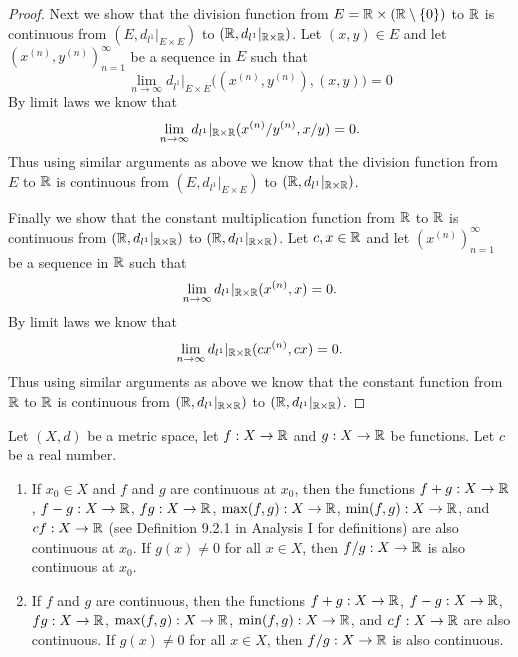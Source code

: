 \begin{proof}
  Next we show that the division function from \(E = \mathbb{R} \times (\mathbb{R} \setminus \left\lbrace0\right\rbrace)\) to \(\mathbb{R}\) is continuous from \((E, d_{l^1}|_{E \times E})\) to \((\mathbb{R}, d_{l^1}|_{\mathbb{R} \times \mathbb{R}})\).
  Let \((x, y) \in E\) and let \((x^{(n)}, y^{(n)})_{n = 1}^\infty\) be a sequence in \(E\) such that
  \[
    \lim_{n \to \infty} d_{l^1}|_{E \times E}\big((x^{(n)}, y^{(n)}), (x, y)\big) = 0
  \]
  By limit laws we know that
  \[
    \lim_{n \to \infty} d_{l^1}|_{\mathbb{R} \times \mathbb{R}}(x^{(n)} / y^{(n)}, x / y) = 0.
  \]
  Thus using similar arguments as above we know that the division function from \(E\) to \(\mathbb{R}\) is continuous from \((E, d_{l^1}|_{E \times E})\) to \((\mathbb{R}, d_{l^1}|_{\mathbb{R} \times \mathbb{R}})\).

  Finally we show that the constant multiplication function from \(\mathbb{R}\) to \(\mathbb{R}\) is continuous from \((\mathbb{R}, d_{l^1}|_{\mathbb{R} \times \mathbb{R}})\) to \((\mathbb{R}, d_{l^1}|_{\mathbb{R} \times \mathbb{R}})\).
  Let \(c, x \in \mathbb{R}\) and let \((x^{(n)})_{n = 1}^\infty\) be a sequence in \(\mathbb{R}\) such that
  \[
    \lim_{n \to \infty} d_{l^1}|_{\mathbb{R} \times \mathbb{R}}(x^{(n)}, x) = 0.
  \]
  By limit laws we know that
  \[
    \lim_{n \to \infty} d_{l^1}|_{\mathbb{R} \times \mathbb{R}}(cx^{(n)}, cx) = 0.
  \]
  Thus using similar arguments as above we know that the constant function from \(\mathbb{R}\) to \(\mathbb{R}\) is continuous from \((\mathbb{R}, d_{l^1}|_{\mathbb{R} \times \mathbb{R}})\) to \((\mathbb{R}, d_{l^1}|_{\mathbb{R} \times \mathbb{R}})\).
\end{proof}

\begin{cor}\label{2.2.3}
  Let \((X, d)\) be a metric space, let \(f : X \to \mathbb{R}\) and \(g : X \to \mathbb{R}\) be functions.
  Let \(c\) be a real number.
  \begin{enumerate}
    \item If \(x_0 \in X\) and \(f\) and \(g\) are continuous at \(x_0\), then the functions \(f + g : X \to \mathbb{R}\), \(f - g : X \to \mathbb{R}\), \(fg : X \to \mathbb{R}\), \(\max(f, g) : X \to \mathbb{R}\), \(\min(f, g) : X \to \mathbb{R}\), and \(cf : X \to \mathbb{R}\) (see Definition 9.2.1 in Analysis I for definitions) are also continuous at \(x_0\).
          If \(g(x) \neq 0\) for all \(x \in X\), then \(f / g : X \to \mathbb{R}\) is also continuous at \(x_0\).
    \item If \(f\) and \(g\) are continuous, then the functions \(f + g : X \to \mathbb{R}\), \(f - g : X \to \mathbb{R}\), \(fg : X \to \mathbb{R}\), \(\max(f, g) : X \to \mathbb{R}\), \(\min(f, g) : X \to \mathbb{R}\), and \(cf : X \to \mathbb{R}\) are also continuous.
          If \(g(x) \neq 0\) for all \(x \in X\), then \(f / g : X \to \mathbb{R}\) is also continuous.
  \end{enumerate}
\end{cor}

